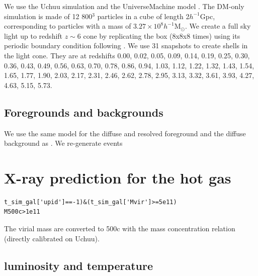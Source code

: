 \documentclass[twocolumn,iop]{openjournal}
\begin{document}
We use the Uchuu simulation \citep{IshiyamaPradaKlypin_2021MNRAS.506.4210I} and the UniverseMachine model \citep{BehrooziWechslerHearin_2019MNRAS.488.3143B, AungNagaiKlypin_2023MNRAS.519.1648A}. 
The DM-only simulation is made of 12 800$^3$ particles in a cube of length 2$h^{-1}$Gpc, corresponding to particles with a mass of $3.27\times10^8h^{-1}$M$_\odot$. 
We create a full sky light up to redshift $z\sim6$ cone by replicating the box (8x8x8 times) using its periodic boundary condition following \citet{ComparatEckertFinoguenov_2020OJAp....3E..13C}. 
We use 31 snapshots to create shells in the light cone. They are at redshifts 0.00, 
0.02, 
0.05, 
0.09, 
0.14, 
0.19, 
0.25, 
0.30, 
0.36, 
0.43, 
0.49, 
0.56, 
0.63, 
0.70, 
0.78, 
0.86, 
0.94, 
1.03, 
1.12, 
1.22, 
1.32, 
1.43, 
1.54, 
1.65, 
1.77, 
1.90, 
2.03, 
2.17, 
2.31, 
2.46, 
2.62, 
2.78, 
2.95, 
3.13, 
3.32, 
3.61, 
3.93, 
4.27, 
4.63, 
5.15, 
5.73. 

\subsection{Foregrounds and backgrounds}
We use the same model for the diffuse and resolved foreground and the diffuse background as  \citet{ComparatEckertFinoguenov_2020OJAp....3E..13C, SeppiComparatBulbul_2022A&A...665A..78S}. 
We re-generate events 


\clearpage
\section{X-ray prediction for the hot gas}

\begin{verbatim}
t_sim_gal['upid']==-1)&(t_sim_gal['Mvir']>=5e11)
M500c>1e11
\end{verbatim}
The virial mass are converted to 500c with the \citet{IshiyamaPradaKlypin_2021MNRAS.506.4210I} mass concentration relation (directly calibrated on Uchuu). 

\subsection{luminosity and temperature}
\end{document}
